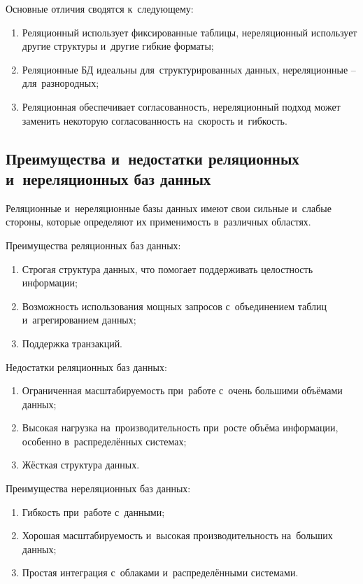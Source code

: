 \documentclass{ou}
\begin{document}
Основные отличия сводятся к~следующему:
\begin{enumerate}[itemindent=4em, nosep, label=\arabic*)]
\item Реляционный использует фиксированные таблицы, нереляционный использует другие структуры и~другие гибкие форматы;
\item Реляционные БД идеальны для~структурированных данных, нереляционные -- для~разнородных;
\item Реляционная обеспечивает согласованность, нереляционный подход может заменить некоторую согласованность на~скорость и~гибкость.
\end{enumerate}
\subsection{Преимущества и~недостатки реляционных и~нереляционных баз данных}
Реляционные и~нереляционные базы данных имеют свои сильные и~слабые стороны, которые определяют их применимость в~различных областях.

Преимущества реляционных баз данных: 
\begin{enumerate}[itemindent=4em, nosep, label=\arabic*)]
\item Строгая структура данных, что помогает поддерживать целостность информации;
\item Возможность использования мощных запросов с~объединением таблиц и~агрегированием данных;
\item Поддержка транзакций.
\end{enumerate}

Недостатки реляционных баз данных:
\begin{enumerate}[itemindent=4em, nosep, label=\arabic*)]
\item Ограниченная масштабируемость при~работе с~очень большими объёмами данных;
\item Высокая нагрузка на~производительность при~росте объёма информации, особенно в~распределённых системах;
\item Жёсткая структура данных.
\end{enumerate}

Преимущества нереляционных баз данных:
\begin{enumerate}[itemindent=4em, nosep, label=\arabic*)]
\item Гибкость при~работе с~данными;
\item Хорошая масштабируемость и~высокая производительность на~больших данных;
\item Простая интеграция с~облаками и~распределёнными системами.
\end{enumerate}
\end{document}
